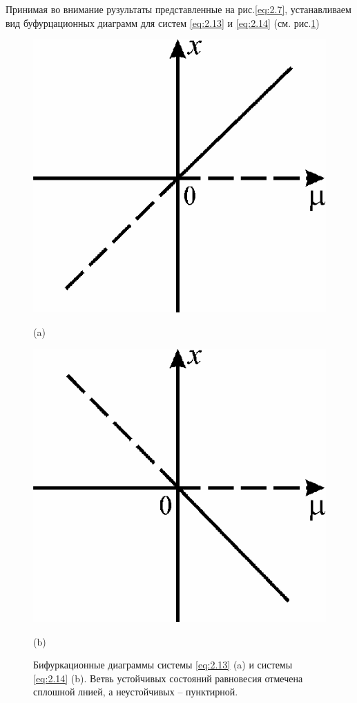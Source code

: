Принимая во внимание рузультаты представленные на рис.\ref{eq:2.7}, устанавливаем вид буфурцационных диаграмм для систем \eqref{eq:2.13} и \eqref{eq:2.14} (см. рис.\ref{fig:2.8})  
\begin{figure}[h!]
	\centering
	\begin{minipage}{0.49\linewidth}
		\centering
		\includegraphics[]{fig/lect2/8a}

		(a)
		\label{fig:2_8a}
	\end{minipage}
	\hfill
	\begin{minipage}{0.49\linewidth}
		\centering
		\includegraphics[]{fig/lect2/8b}
        
		(b)
		\label{fig:2_8b}
	\end{minipage}
	\caption{Бифуркационные диаграммы системы \eqref{eq:2.13} (a) и системы \eqref{eq:2.14} (b). Ветвь устойчивых состояний равновесия отмечена сплошной лнией, а неустойчивых -- пунктирной.}
	\label{fig:2.8}
	
\end{figure}
